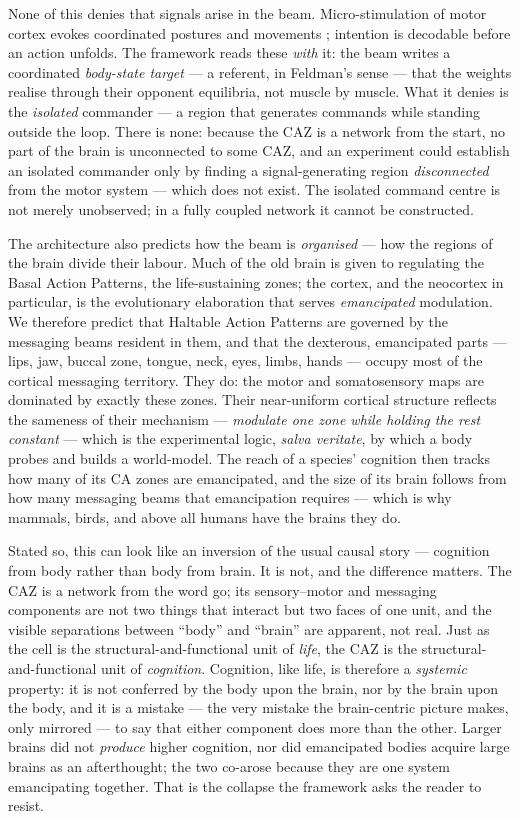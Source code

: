 \documentclass{article}
\begin{document}
None of this denies that signals arise in the beam.  Micro-stimulation of
motor cortex evokes coordinated postures and movements
\citep{Graziano2002ComplexMovements}; intention is decodable before an
action unfolds.  The framework reads these \emph{with} it: the beam writes
a coordinated \emph{body-state target} --- a referent, in Feldman's sense
\citep{Feldman2015ReferentControl} --- that the weights realise through
their opponent equilibria, not muscle by muscle.  What it denies is the
\emph{isolated} commander --- a region that generates commands while
standing outside the loop.  There is none: because the CAZ is a network
from the start, no part of the brain is unconnected to some CAZ, and an
experiment could establish an isolated commander only by finding a
signal-generating region \emph{disconnected} from the motor system ---
which does not exist.  The isolated command centre is not merely
unobserved; in a fully coupled network it cannot be constructed.

The architecture also predicts how the beam is \emph{organised} --- how the
regions of the brain divide their labour.  Much of the old brain is given
to regulating the Basal Action Patterns, the life-sustaining zones; the
cortex, and the neocortex in particular, is the evolutionary elaboration
that serves \emph{emancipated} modulation.  We therefore predict that
Haltable Action Patterns are governed by the messaging beams resident in
them, and that the dexterous, emancipated parts --- lips, jaw, buccal zone,
tongue, neck, eyes, limbs, hands --- occupy most of the cortical messaging
territory.  They do: the motor and somatosensory maps are dominated by
exactly these zones.  Their near-uniform cortical structure reflects the
sameness of their mechanism --- \emph{modulate one zone while holding the
rest constant} --- which is the experimental logic, \emph{salva veritate},
by which a body probes and builds a world-model.  The reach of a species'
cognition then tracks how many of its CA zones are emancipated, and the
size of its brain follows from how many messaging beams that emancipation
requires --- which is why mammals, birds, and above all humans have the
brains they do.

Stated so, this can look like an inversion of the usual causal story ---
cognition from body rather than body from brain.  It is not, and the
difference matters.  The CAZ is a network from the word go; its
sensory--motor and messaging components are not two things that interact
but two faces of one unit, and the visible separations between ``body'' and
``brain'' are apparent, not real.  Just as the cell is the
structural-and-functional unit of \emph{life}, the CAZ is the
structural-and-functional unit of \emph{cognition}.  Cognition, like life,
is therefore a \emph{systemic} property: it is not conferred by the body
upon the brain, nor by the brain upon the body, and it is a mistake --- the
very mistake the brain-centric picture makes, only mirrored --- to say that
either component does more than the other.  Larger brains did not
\emph{produce} higher cognition, nor did emancipated bodies acquire large
brains as an afterthought; the two co-arose because they are one system
emancipating together.  That is the collapse the framework asks the reader
to resist.
\end{document}
